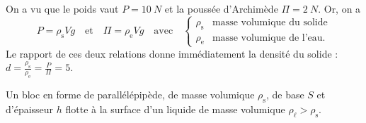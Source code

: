 \begin{corrige}
On a vu que le poids vaut $P=\SI{10}{N}$ et la poussée d'Archimède $\Pi=\SI{2}{N}$. Or, on a 
\[
P=\rho_\text{s}Vg
\quad\text{et}\quad
\Pi=\rho_\text{e} Vg
\quad\text{avec}\quad
\begin{cases}
\rho_\text{s}&\text{masse volumique du solide}\\
\rho_\text{e}&\text{masse volumique de l'eau}.
\end{cases}
\]
Le rapport de ces deux relations donne immédiatement la densité du solide : $d=\frac{\rho_\text{s}}{\rho_\text{e}}=\frac{P}{\Pi}=5$.
\end{corrige}


\finEntrainement



\hauteurLargeurCadreReponse		{7mm}{3cm}
\initialisationEntrainement

                                \initialisationPartieGauche %
Un bloc en forme de parallélépipède, de masse volumique $\rho_\text{s}$, de base $S$ et d'épaisseur $h$ flotte à la surface d'un liquide de masse volumique $\rho_\ell>\rho_\text{s}$. 

